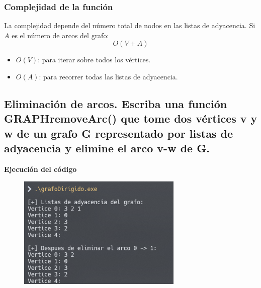 \documentclass{article}
\begin{document}
        \subsubsection*{Complejidad de la función}
            La complejidad depende del número total de nodos en las listas de adyacencia. Si \( A \) es el número de arcos del grafo:
            \[
            O(V + A)
            \]
            \begin{itemize}
                \item \( O(V) \): para iterar sobre todos los vértices.
                \item \( O(A) \): para recorrer todas las listas de adyacencia.
            \end{itemize}


    \subsection{Eliminación de arcos. Escriba una función GRAPHremoveArc() que tome dos vértices v y w de un grafo G representado por listas de adyacencia y elimine el arco v-w de G.}

        

        \textbf{Ejecución del código}
            \begin{figure}[H]
            	\centering
             	\includegraphics[width=0.7\textwidth,keepaspectratio]{img/exercise5.png}
            \end{figure}
\end{document}
